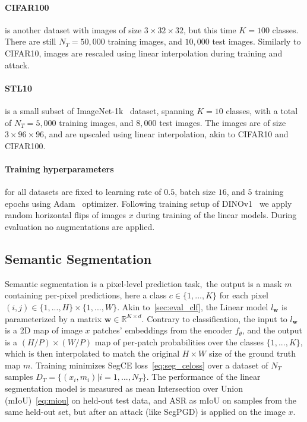 \paragraph{CIFAR100~\cite{cifar}} is another dataset with images of size $3\times 32\times 32$, but this time $K=100$ classes. There are still $N_T=50,000$ training images, and $10,000$ test images. Similarly to CIFAR10, images are rescaled using linear interpolation during training and attack.

\paragraph{STL10~\cite{stl10}} is a small subset of ImageNet-1k~\cite{imagenet} dataset, spanning $K=10$ classes, with a total of $N_T=5,000$ training images, and $8,000$ test images. The images are of size $3\times 96\times 96$, and are upscaled using linear interpolation, akin to CIFAR10 and CIFAR100.

\paragraph{Training hyperparameters} for all datasets are fixed to learning rate of $0.5$, batch size $16$, and $5$ training epochs using Adam~\cite{adam} optimizer. Following training setup of DINOv1~\cite{dinov1} we apply random horizontal flips of images $x$ during training of the linear models. During evaluation no augmentations are applied.

\subsection{Semantic Segmentation}

Semantic segmentation is a pixel-level prediction task,~\ie the output is a mask $m$ containing per-pixel predictions, here a class $c\in\{1,...,K\}$ for each pixel $(i,j)\in\{1,...,H\}\times\{1,...,W\}$. Akin to~\cref{sec:eval_clf}, the Linear model $l_\mathbf{w}$ is parameterized by a matrix $\mathbf{w}\in\mathbb{R}^{K\times d}$. Contrary to classification, the input to $l_\mathbf{w}$ is a 2D map of image $x$ patches' embeddings from the encoder $f_\theta$, and the output is a $(H/P)\times(W/P)$ map of per-patch probabilities over the classes $\{1,...,K\}$, which is then interpolated to match the original $H\times W$ size of the ground truth map $m$. Training minimizes SegCE loss~\cref{eq:seg_celoss} over a dataset of $N_T$ samples $D_T=\{(x_i,m_i)|i=1,...,N_T\}$. The performance of the linear segmentation model is measured as mean Intersection over Union (mIoU)~\cref{eq:miou} on held-out test data, and ASR as mIoU on samples from the same held-out set, but after an attack (like SegPGD) is applied on the image $x$.

